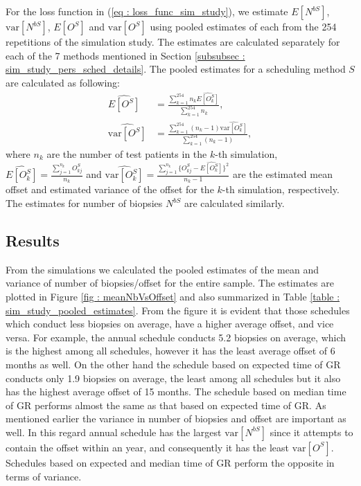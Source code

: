 For the loss function in (\ref{eq : loss_func_sim_study}), we estimate $E[N^{bS}]$, $\mbox{var}[N^{bS}]$, $E[O^S]$ and $\mbox{var}[O^S]$ using pooled estimates of each from the 254 repetitions of the simulation study. The estimates are calculated separately for each of the 7 methods mentioned in Section \ref{subsubsec : sim_study_pers_sched_details}. The pooled estimates for a scheduling method $S$ are calculated as following:
\begin{align*}
\widehat{E[O^S]} &= \frac{\sum_{k=1}^{254} n_k \widehat{E[O^S_k]}}{\sum_{k=1}^{254} n_k}, \\
\widehat{\mbox{var}[O^S]} &= \frac{\sum_{k=1}^{254} (n_k - 1) \widehat{\mbox{var}[O^S_k]}}{\sum_{k=1}^{254} (n_k-1)}, 
\end{align*}
where $n_k$ are the number of test patients in the $k$-th simulation, $\widehat{E[O^S_k]} = \frac{\sum_{j=1}^{n_k}O^S_{kj}}{n_k}$ and $\widehat{\mbox{var}[O^S_k]} = \frac{\sum_{j=1}^{n_k}\big\{O^S_{kj} - \widehat{E[O^S_k]}\big\}^2}{n_k-1}$ are the estimated mean offset and estimated variance of the offset for the $k$-th simulation, respectively. The estimates for number of biopsies $N^{bS}$ are calculated similarly.

\subsection{Results}
From the simulations we calculated the pooled estimates of the mean and variance of number of biopsies/offset for the entire sample. The estimates are plotted in Figure \ref{fig : meanNbVsOffset} and also summarized in Table \ref{table : sim_study_pooled_estimates}. From the figure it is evident that those schedules which conduct less biopsies on average, have a higher average offset, and vice versa. For example, the annual schedule conducts 5.2 biopsies on average, which is the highest among all schedules, however it has the least average offset of 6 months as well. On the other hand the schedule based on expected time of GR conducts only 1.9 biopsies on average, the least among all schedules but it also has the highest average offset of 15 months. The schedule based on median time of GR performs almost the same as that based on expected time of GR. As mentioned earlier the variance in number of biopsies and offset are important as well. In this regard annual schedule has the largest $\mbox{var}[N^{bS}]$ since it attempts to contain the offset within an year, and consequently it has the least $\mbox{var}[O^S]$. Schedules based on expected and median time of GR perform the opposite in terms of variance.

